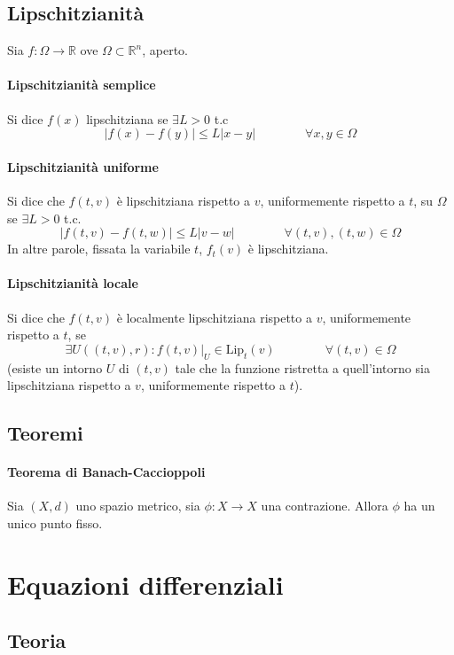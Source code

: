 \documentclass[a4paper,12pt]{article}
\begin{document}
\subsection{Lipschitzianità}
Sia $f:\Omega\rightarrow\mathbb{R}$ ove $\Omega\subset\mathbb{R}^n$, aperto.
\paragraph{Lipschitzianità semplice}
Si dice $f\left(x\right)$ lipschitziana se $\exists L>0$ t.c
$$ |f\left(x\right)- f\left(y\right)| \leq L|x-y|\qquad\qquad\forall x,y \in \Omega $$

\paragraph{Lipschitzianità uniforme}
Si dice che $f(t, v)$ è lipschitziana rispetto a $v$, uniformemente rispetto a $t$, su $\Omega$ se $\exists L>0$ t.c.
$$|f(t, v) - f(t, w)| \leq L|v-w|\qquad\qquad\forall (t,v), (t, w) \in \Omega$$
In altre parole, fissata la variabile $t$, $f_t(v)$ è lipschitziana.

\paragraph{Lipschitzianità locale}
Si dice che $f(t, v)$ è localmente lipschitziana rispetto a $v$, uniformemente rispetto a $t$, se
$$\exists U((t, v), r) : f(t, v)|_U \in \text{Lip}_t(v)\qquad\qquad\forall(t, v)\in \Omega$$
(esiste un intorno $U$ di $(t, v)$ tale che la funzione ristretta a quell'intorno sia lipschitziana rispetto a $v$, uniformemente rispetto a $t$).

\subsection{Teoremi}
\paragraph{Teorema di Banach-Caccioppoli}
Sia $(X, d)$ uno spazio metrico, sia $\phi : X\rightarrow X$ una contrazione.
Allora $\phi$ ha un unico punto fisso.


\section{Equazioni differenziali}

\subsection{Teoria}
\end{document}

